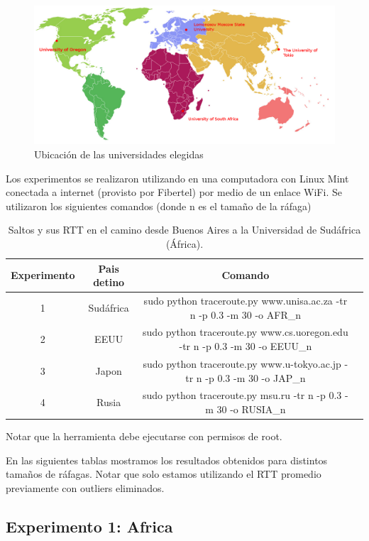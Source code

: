  
\begin{figure}[H]
  \centering
  \includegraphics[scale = 0.3]{imagenes/mapa.png}
  \caption{Ubicación de las universidades elegidas}
  \label{histogramaprobabilidadesModel1}
\end{figure}


Los experimentos se realizaron utilizando en una computadora con Linux Mint conectada a internet (provisto por Fibertel) por medio de un enlace WiFi. Se utilizaron los siguientes comandos (donde n es el tamaño de la ráfaga) 
\begin{table}[]
\centering
\caption{Saltos y sus RTT en el camino desde Buenos Aires a la Universidad de Sudáfrica (África).}
\begin{tabular}{ | c | c | c | c | }
	\hline 
Experimento & Pais detino& Comando\\ \hline
 1 & Sudáfrica & sudo python traceroute.py www.unisa.ac.za -tr n -p 0.3 -m 30 -o AFR\_n \\ 
  2 & EEUU& sudo python traceroute.py www.cs.uoregon.edu -tr n -p 0.3 -m 30 -o EEUU\_n \\ 
  3 & Japon& sudo python traceroute.py www.u-tokyo.ac.jp -tr n -p 0.3 -m 30 -o JAP\_n \\ 
  4 & Rusia & sudo python traceroute.py msu.ru -tr n -p 0.3 -m 30 -o RUSIA\_n \\ 
  \hline

\end{tabular}
\end{table}
  Notar que la herramienta debe ejecutarse con permisos de root.
  

En las siguientes tablas mostramos los resultados obtenidos para distintos tamaños de ráfagas. Notar que solo estamos utilizando el RTT promedio previamente con outliers eliminados.

\newpage

\subsection{Experimento 1: Africa}

\begin{landscape}

\end{landscape}


